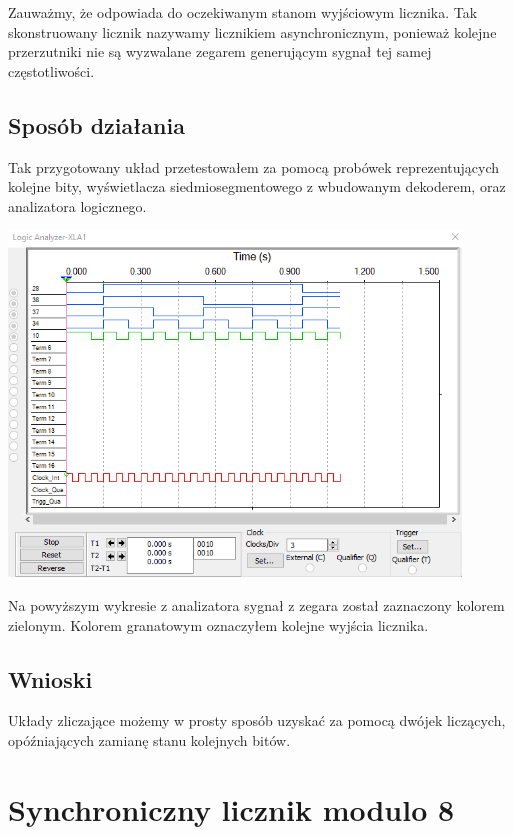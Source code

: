 \documentclass{article}
\begin{document}
            \FloatBarrier
            Zauważmy, że odpowiada do oczekiwanym stanom wyjściowym licznika. Tak skonstruowany licznik nazywamy licznikiem asynchronicznym, ponieważ kolejne przerzutniki nie są wyzwalane zegarem generującym sygnał tej samej częstotliwości. 

        
        \subsection{Sposób działania}
            Tak przygotowany układ przetestowałem za pomocą probówek reprezentujących kolejne bity, wyświetlacza siedmiosegmentowego z wbudowanym dekoderem, oraz analizatora logicznego. 
            \begin{center}
                \includegraphics[width=12cm]{reports/img/Z3B_2.png}\\
            \end{center}
            \FloatBarrier
            Na powyższym wykresie z analizatora sygnał z zegara został zaznaczony kolorem zielonym. Kolorem granatowym oznaczyłem kolejne wyjścia licznika. 
        
        \subsection{Wnioski}
            Układy zliczające możemy w prosty sposób uzyskać za pomocą dwójek liczących, opóźniających zamianę stanu kolejnych bitów. 
            
    \section{Synchroniczny licznik modulo 8}
\end{document}
